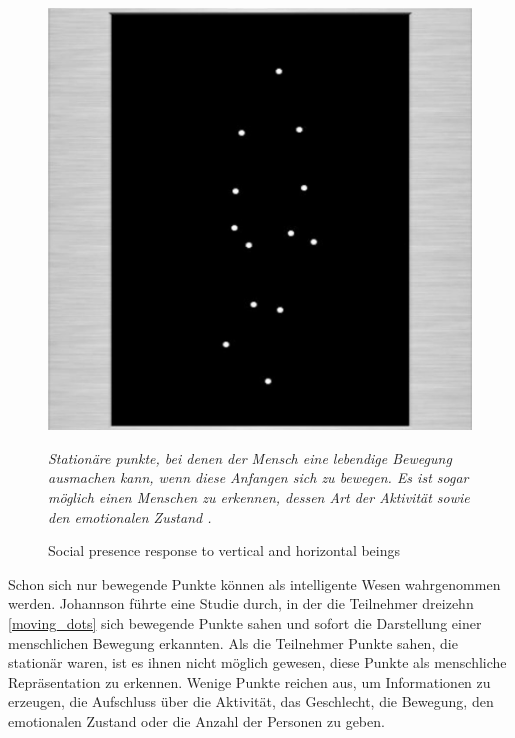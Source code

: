 \documentclass[a4paper,11pt]{article}%
\renewcommand{\\}{\vspace*{0.5\baselineskip} \newline}
\begin{document}
\begin{figure}[b!]
		\begin{footnotesize}
		\centering
			\includegraphics[scale= 0.5]{Abbildungen/moving_dots.JPG}
			\caption[Abbildung 1]{Social presence response to vertical and
horizontal beings}
			\textit{Stationäre punkte, bei denen der Mensch eine lebendige Bewegung ausmachen kann, wenn diese Anfangen sich zu bewegen. Es ist sogar möglich einen Menschen zu erkennen, dessen Art der Aktivität sowie den emotionalen Zustand \citep{biocca2002defining} \citep[p.76-89]{johansson1975visual}.}
			\label{moving_dots}
		\end{footnotesize}
	\end{figure}

Schon sich nur bewegende Punkte können als intelligente Wesen wahrgenommen werden. Johannson \citep[p.76-89]{johansson1975visual} führte eine Studie durch, in der die Teilnehmer dreizehn \autoref{moving_dots} sich bewegende Punkte sahen und sofort die Darstellung einer menschlichen Bewegung erkannten. Als die Teilnehmer Punkte sahen, die stationär waren, ist es ihnen nicht möglich gewesen, diese Punkte als menschliche Repräsentation zu erkennen. Wenige Punkte reichen aus, um Informationen zu erzeugen, die Aufschluss über die Aktivität, das Geschlecht, die Bewegung, den emotionalen Zustand oder die Anzahl der Personen zu geben.
\end{document}
